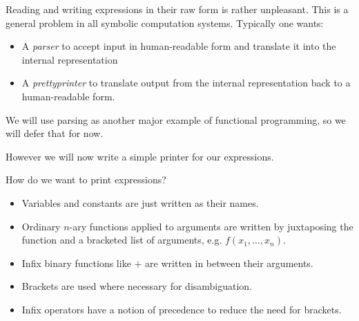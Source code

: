\begin{slide*}


\vspace*{0.5cm}

Reading and writing expressions in their raw form is rather unpleasant. This is
a general problem in all symbolic computation systems. Typically one wants:

\begin{itemize}

\item A {\em parser} to accept input in human-readable form and translate it
into the internal representation

\item A {\em prettyprinter} to translate output from the internal
representation back to a human-readable form.

\end{itemize}

We will use parsing as another major example of functional programming, so we
will defer that for now.

However we will now write a simple printer for our expressions.

\end{slide*}



\begin{slide*}


\vspace*{0.5cm}

How do we want to print expressions?

\begin{itemize}

\item Variables and constants are just written as their names.

\item Ordinary $n$-ary functions applied to arguments are written by
juxtaposing the function and a bracketed list of arguments, e.g. {\red
$f(x_1,\ldots,x_n)$}.

\item Infix binary functions like {\red $+$} are written in between their
arguments.

\item Brackets are used where necessary for disambiguation.

\item Infix operators have a notion of precedence to reduce the need for
brackets.

\end{itemize}

\end{slide*}



